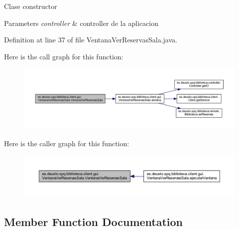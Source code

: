 Clase constructor 
\begin{DoxyParams}{Parameters}
{\em controller} & controller de la aplicacion \\
\hline
\end{DoxyParams}


Definition at line 37 of file Ventana\+Ver\+Reservas\+Sala.\+java.

Here is the call graph for this function\+:
\nopagebreak
\begin{figure}[H]
\begin{center}
\leavevmode
\includegraphics[width=350pt]{classes_1_1deusto_1_1spq_1_1biblioteca_1_1client_1_1gui_1_1_ventana_ver_reservas_sala_a442cdd7ff976480949f709fcfcb91025_cgraph}
\end{center}
\end{figure}
Here is the caller graph for this function\+:
\nopagebreak
\begin{figure}[H]
\begin{center}
\leavevmode
\includegraphics[width=350pt]{classes_1_1deusto_1_1spq_1_1biblioteca_1_1client_1_1gui_1_1_ventana_ver_reservas_sala_a442cdd7ff976480949f709fcfcb91025_icgraph}
\end{center}
\end{figure}


\subsection{Member Function Documentation}
\mbox{\label{classes_1_1deusto_1_1spq_1_1biblioteca_1_1client_1_1gui_1_1_ventana_ver_reservas_sala_a405dbde710635ada1ad7c4514cda6ff6}} 
